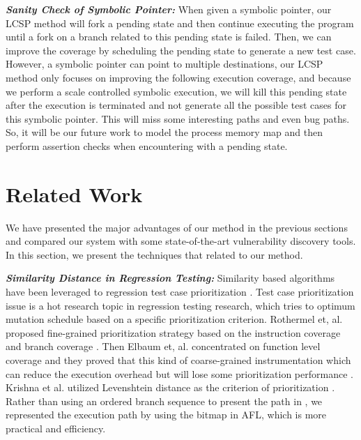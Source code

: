 \documentclass[a4paper]{article}
\begin{document}
\noindent\textit{\textbf{Sanity Check of Symbolic Pointer:}} When given a symbolic pointer, our LCSP method will fork a pending state and then continue executing the program until a fork on a branch related to this pending state is failed. Then, we can improve the coverage by scheduling the pending state to generate a new test case. However, a symbolic pointer can point to multiple destinations, our LCSP method only focuses on improving the following execution coverage, and because we perform a scale controlled symbolic execution, we will kill this pending state after the execution is terminated and not generate all the possible test cases for this symbolic pointer. This will miss some interesting paths and even bug paths. So, it will be our future work to model the process memory map and then perform assertion checks when encountering with a pending state.

\section{Related Work} \label{sec:related}
We have presented the major advantages of our method in the previous sections and compared our system with some state-of-the-art vulnerability discovery tools. In this section, we present the techniques that related to our method.

\noindent\textit{\textbf{Similarity Distance in Regression Testing:}}
Similarity based algorithms have been leveraged to regression test case prioritization \cite{wang2015similarity, zhang2012simfuzz, jones2003test}. Test case prioritization issue is a hot research topic in regression testing research, which tries to optimum mutation schedule based on a specific prioritization criterion. Rothermel et, al. proposed fine-grained prioritization strategy based on the instruction coverage and branch coverage \cite{rothermel2001prioritizing}. Then Elbaum et, al. concentrated on function level coverage and they proved that this kind of coarse-grained instrumentation which can reduce the execution overhead but will lose some prioritization performance \cite{elbaum2001incorporating}. Krishna et al. utilized Levenshtein distance as the criterion of prioritization \cite{krishnamoorthi2009factor}. Rather than using an ordered branch sequence to present the path in \cite{wang2015similarity}, we represented the execution path by using the bitmap in AFL, which is more practical and efficiency.
\end{document}
